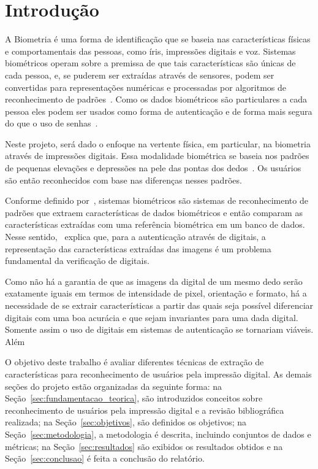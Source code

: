 \section{Introdução}\label{sec:introduacao}

A Biometria é uma forma de identificação que se baseia nas características físicas e comportamentais das pessoas, como íris, impressões digitais e voz. Sistemas biométricos operam sobre a premissa de que tais características são únicas de cada pessoa, e, se puderem ser extraídas através de sensores, podem ser convertidas para representações numéricas e processadas por algoritmos de reconhecimento de padrões~\cite{handbook_of_fp_recognition}. Como os dados biométricos são particulares a cada pessoa eles podem ser usados como forma de autenticação e de forma mais segura do que o uso de senhas~\cite{biometrics_a_tool_for_information_security}. 

Neste projeto, será dado o enfoque na vertente física, em particular, na biometria através de impressões digitais. Essa modalidade biométrica se baseia nos padrões de pequenas elevações e depressões na pele das pontas dos dedos~\cite{handbook_of_fp_recognition}. Os usuários são então reconhecidos com base nas diferenças nesses padrões.

Conforme definido por~, sistemas biométricos são sistemas de reconhecimento de padrões que extraem características de dados biométricos e então comparam as características extraídas com uma referência biométrica em um banco de dados. Nesse sentido,~ explica que, para a autenticação através de digitais, a representação das características extraídas das imagens é um problema fundamental da verificação de digitais. 

Como não há a garantia de que as imagens da digital de um mesmo dedo serão exatamente iguais em termos de intensidade de pixel, orientação e formato, há a necessidade de se extrair características a partir das quais seja possível diferenciar digitais com uma boa acurácia e que sejam invariantes para uma dada digital. Somente assim o uso de digitais em sistemas de autenticação se tornariam viáveis. Além 

O objetivo deste trabalho é avaliar diferentes técnicas de extração de características para reconhecimento de usuários pela impressão digital. As demais seções do projeto estão organizadas da seguinte forma: na Seção~\ref{sec:fundamentacao_teorica}, são introduzidos conceitos sobre reconhecimento de usuários pela impressão digital e a revisão bibliográfica realizada; na Seção~\ref{sec:objetivos}, são definidos os objetivos; na Seção~\ref{sec:metodologia}, a metodologia é descrita, incluindo conjuntos de dados e métricas; na Seção~\ref{sec:resultados} são exibidos os resultados obtidos e na Seção~\ref{sec:conclusao} é feita a conclusão do relatório.
